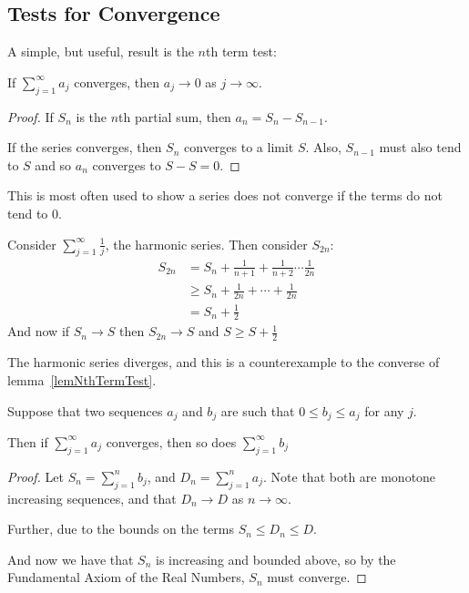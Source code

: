 \documentclass[../Main.tex]{subfiles}
\begin{document}
\subsection{Tests for Convergence}
A simple, but useful, result is the $n$th term test:
\begin{lemma}
    If $\sum_{j=1}^\infty a_j$ converges, then $a_j \to 0$ as $j \to \infty$.
    \label{lemNthTermTest}
\end{lemma}
\begin{proof}
    If $S_n$ is the $n$th partial sum, then $a_n = S_n - S_{n-1}$.\par
    If the series converges, then $S_n$ converges to a limit $S$. Also, $S_{n-1}$ must also tend to $S$ and so $a_n$ converges to $S - S = 0$.
\end{proof}
\begin{remark}
    This is most often used to show a series does not converge if the terms do not tend to 0.
\end{remark}
\begin{example}
    Consider $\sum_{j=1}^\infty \frac{1}{j}$, the harmonic series.
    Then consider $S_{2n}$:
    \begin{align*}
        S_{2n} &= S_n + \frac{1}{n+1} + \frac{1}{n+2} \cdots \frac{1}{2n} \\
        &\geq S_n + \frac{1}{2n} + \cdots + \frac{1}{2n} \\
        &= S_n + \frac{1}{2}
    \end{align*}
    And now if $S_n \to S$ then $S_{2n} \to S$ and $S \geq S + \frac{1}{2}$ \contradiction\par
    The harmonic series diverges, and this is a counterexample to the converse of lemma~\ref{lemNthTermTest}.
\end{example}
\begin{theorem}
    Suppose that two sequences $a_j$ and $b_j$ are such that $0 \leq b_j \leq a_j$ for any $j$.\par
    Then if $\sum_{j=1}^\infty a_j$ converges, then so does $\sum_{j=1}^\infty b_j$
    \label{thmComparisonTest}
\end{theorem}
\begin{proof}
    Let $S_n = \sum_{j=1}^n b_j$, and $D_n = \sum_{j=1}^n a_j$. Note that both are monotone increasing sequences, and that $D_n \to D$ as $n \to \infty$.\par
    Further, due to the bounds on the terms $S_n \leq D_n \leq D$.\par
    And now we have that $S_n$ is increasing and bounded above, so by the Fundamental Axiom of the Real Numbers, $S_n$ must converge.
\end{proof}
\end{document}
